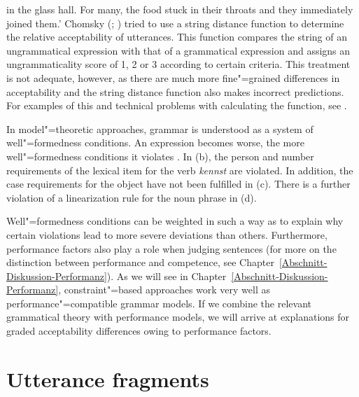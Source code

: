 in the glass hall. For many, the food stuck in their throats and they immediately joined them.'
\z
Chomsky (\citeyear[Chapter~5]{Chomsky75a}; \citeyear{Chomsky64a}) tried to use a string distance function to determine the relative
acceptability of utterances. This function compares the string of an ungrammatical expression with that of a grammatical expression
and assigns an ungrammaticality score of 1, 2 or 3 according to certain criteria. This treatment is not adequate, however, as there
are much more fine"=grained differences in acceptability and the string distance function also makes incorrect predictions.
For examples of this and technical problems with calculating the function, see .

In model"=theoretic approaches, grammar is understood as a system of well"=formedness conditions. An expression becomes worse, the
more well"=formedness conditions it violates \citep[--27]{PS2001a}. In (b), the person and number requirements of
the lexical item for the verb \emph{kennst} are violated. In addition, the case requirements for the object have not been fulfilled in
(c). There is a further violation of a linearization rule for the noun phrase in (d).

Well"=formedness conditions can be weighted in such a way as to explain why certain violations lead to more severe deviations than
others. Furthermore, performance factors also play a role when judging sentences (for more on the distinction between performance
and competence, see Chapter~\ref{Abschnitt-Diskussion-Performanz}). As we will see in Chapter~\ref{Abschnitt-Diskussion-Performanz},
constraint"=based approaches work very well as performance"=compatible grammar models. If we combine the relevant grammatical theory
with performance models, we will arrive at explanations for graded acceptability differences owing to performance factors.

\section{Utterance fragments}


